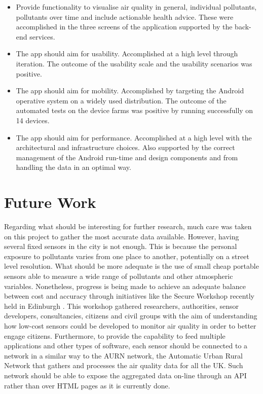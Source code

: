 \begin{itemize}
	\item Provide functionality to visualise air quality in general, individual pollutants, pollutants over time and include actionable health advice. These were accomplished in the three screens of the application supported by the back-end services.
	\item The app should aim for usability. Accomplished at a high level through iteration. The outcome of the usability scale and the usability scenarios was positive. 
    \item The app should aim for mobility. Accomplished by targeting the Android operative system on a widely used distribution. The outcome of the automated tests on the device farms was positive by running successfully on 14 devices.
    \item The app should aim for performance. Accomplished at a high level with the architectural and infrastructure choices. Also supported by the correct management of the Android run-time and design components and from handling the data in an optimal way. 
\end{itemize}

\section{Future Work}
Regarding what should be interesting for further research, much care was taken on this project to gather the most accurate data available. However, having several fixed sensors in the city is not enough. This is because the personal exposure to pollutants varies from one place to another, potentially on a street level resolution. What should be more adequate is the use of small cheap portable sensors able to measure a wide range of pollutants and other atmospheric variables. Nonetheless, progress is being made to achieve an adequate balance between cost and accuracy through initiatives like the Secure Workshop recently held in Edinburgh \cite{SecureWorkshop2016}. This workshop gathered researchers, authorities, sensor developers, consultancies, citizens and civil groups with the aim of understanding how low-cost sensors could be developed to monitor air quality in order to better engage citizens. Furthermore, to provide the capability to feed multiple applications and other types of software, each sensor should be connected to a network in a similar way to the AURN network, the Automatic Urban Rural Network that gathers and processes the air quality data for all the UK. Such network should be able to expose the aggregated data on-line through an API rather than over HTML pages as it is currently done.


